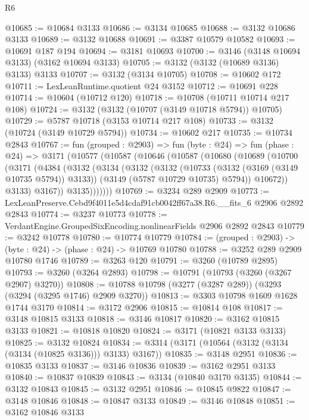 \begin{lexlean}{R6}
\begin{coremodule}
@10685 := @10684 @3133
@10686 := @3134 @10685
@10688 := @3132 @10686 @3133
@10689 := @3132 @10688
@10691 := @3387 @10579 @10582
@10693 := @10691 @187 @194
@10694 := @3181 @10693
@10700 := @3146 (@3148 @10694 @3133) (@3162 @10694 @3133)
@10705 := @3132 (@3132 (@10689 @3136) @3133) @3133
@10707 := @3132 (@3134 @10705)
@10708 := @10602 @172
@10711 := LexLeanRuntime.quotient @24 @3152
@10712 := @10691 @228
@10714 := @10604 (@10712 @120)
@10718 := @10708 (@10711 @10714 @217 @108)
@10724 := @3132 (@3132 (@10707 (@3149 @10718 @5794)) @10705)
@10729 := @5787 @10718 (@3153 @10714 @217 @108)
@10733 := @3132 (@10724 (@3149 @10729 @5794))
@10734 := @10602 @217
@10735 := @10734 @2843
@10767 := fun (grouped : @2903) =>
  fun (byte : @24) =>
  fun (phase : @24) =>
  @3171
    (@10577
      (@10587
        (@10646
          (@10587
            (@10680
              (@10689
                (@10700
                  (@3171
                    (@4384
                      (@3132
                        (@3134
                          (@3132
                            (@3132
                              (@10733 (@3132 (@3169 (@3149 @10735 @5794)) @3133))
                              (@3149 (@5787 @10729 @10735) @5794))
                            @10672))
                        @3133)
                      @3167))
                  @3135)))))))
@10769 := @3234 @289 @2909
@10773 := LexLeanPreserve.Cebd9f4011e5d4cdaf91cb0042ff67a38.R6.__fits_6 @2906 @2892 @2843
@10774 := @3237 @10773
@10778 := VerdantEngine.GroupedSixEncoding.nonlinearFields @2906 @2892 @2843
@10779 := @3242 @10778
@10780 := @10774 @10779
@10784 := (grouped : @2903) -> (byte : @24) -> (phase : @24) -> @10769 @10780
@10788 := @3252 @289 @2909 @10780 @1746
@10789 := @3263 @120
@10791 := @3260 (@10789 @2895)
@10793 := @3260 (@3264 @2893)
@10798 := @10791 (@10793 (@3260 (@3267 @2907) @3270))
@10808 := @10788 @10798 (@3277 (@3287 @289)) (@3293 (@3294 (@3295 @1746) @2909 @3270))
@10813 := @3303 @10798 @1609 @1628 @1744 @3170
@10814 := @3172 @2906
@10815 := @10814 @108
@10817 := @3148 @10815 @3133
@10818 := @3146 @10817
@10820 := @3162 @10815 @3133
@10821 := @10818 @10820
@10824 := @3171 (@10821 @3133 @3133)
@10825 := @3132 @10824
@10834 := @3314 (@3171 (@10564 (@3132 (@3134 (@3134 (@10825 @3136))) @3133) @3167))
@10835 := @3148 @2951
@10836 := @10835 @3133
@10837 := @3146 @10836
@10839 := @3162 @2951 @3133
@10840 := @10837 @10839
@10843 := @3134 (@10840 @3170 @3135)
@10844 := @3132 @10843
@10845 := @3132 @2951
@10846 := @10845 @9822
@10847 := @3148 @10846
@10848 := @10847 @3133
@10849 := @3146 @10848
@10851 := @3162 @10846 @3133

\end{coremodule}
\end{lexlean}
